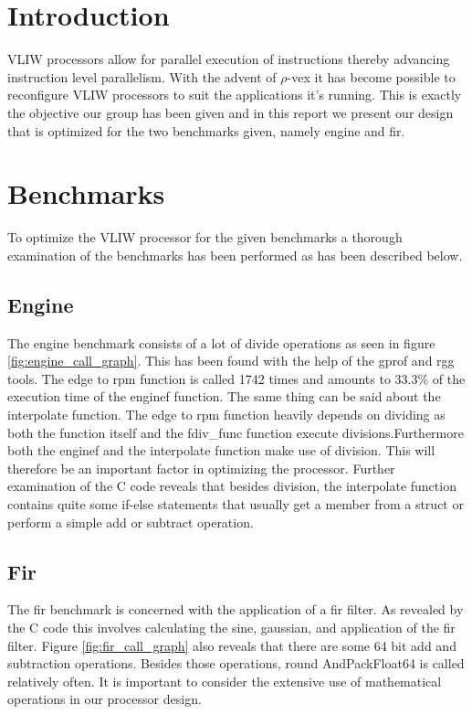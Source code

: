 \section{Introduction}
VLIW processors allow for parallel execution of instructions thereby advancing instruction level parallelism. With the advent of $\rho$-vex it has become possible to reconfigure VLIW processors to suit the applications it's running. This is exactly the objective our group has been given and in this report we present our design that is optimized for the two benchmarks given, namely engine and fir.

\section{Benchmarks}
\label{ch:benchmarks}
To optimize the VLIW processor for the given benchmarks a thorough examination of the benchmarks has been performed as has been described below.

\subsection{Engine}
The engine benchmark consists of a lot of divide operations as seen in figure \ref{fig:engine_call_graph}. This has been found with the help of the gprof and rgg tools. The edge to rpm function is called 1742 times and amounts to 33.3\% of the execution time of the enginef function. The same thing can be said about the interpolate function. The edge to rpm function heavily depends on dividing as both the function itself and the fdiv\_func function execute divisions.Furthermore both the enginef and the interpolate function make use of division. This will therefore be an important factor in optimizing the processor. Further examination of the C code reveals that besides division, the interpolate function contains quite some if-else statements that usually get a member from a struct or perform a simple add or subtract operation.

\subsection{Fir}
The fir benchmark is concerned with the application of a fir filter. As revealed by the C code this involves calculating the sine, gaussian, and application of the fir filter. Figure \ref{fig:fir_call_graph} also reveals that there are some 64 bit add and subtraction operations. Besides those operations, round AndPackFloat64 is called relatively often. It is important to consider the extensive use of mathematical operations in our processor design.

